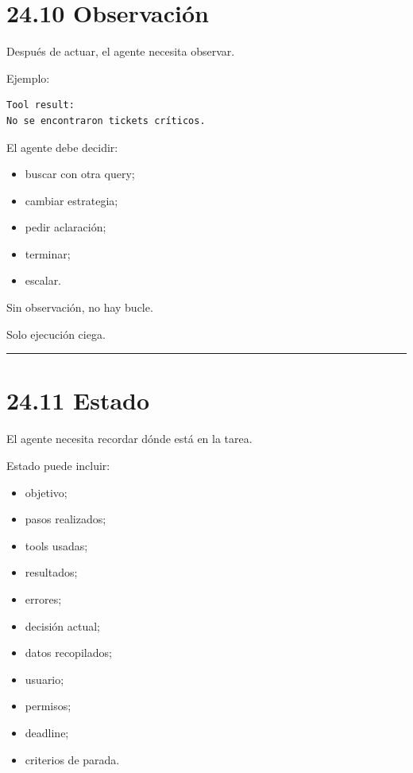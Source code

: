 \section{24.10 Observación}\label{observaciuxf3n}

Después de actuar, el agente necesita observar.

Ejemplo:

\begin{lstlisting}
Tool result:
No se encontraron tickets críticos.
\end{lstlisting}

El agente debe decidir:

\begin{itemize}
\tightlist
\item
  buscar con otra query;
\item
  cambiar estrategia;
\item
  pedir aclaración;
\item
  terminar;
\item
  escalar.
\end{itemize}

Sin observación, no hay bucle.

Solo ejecución ciega.

\begin{center}\rule{0.5\linewidth}{0.5pt}\end{center}

\section{24.11 Estado}\label{estado}

El agente necesita recordar dónde está en la tarea.

Estado puede incluir:

\begin{itemize}
\tightlist
\item
  objetivo;
\item
  pasos realizados;
\item
  tools usadas;
\item
  resultados;
\item
  errores;
\item
  decisión actual;
\item
  datos recopilados;
\item
  usuario;
\item
  permisos;
\item
  deadline;
\item
  criterios de parada.
\end{itemize}

